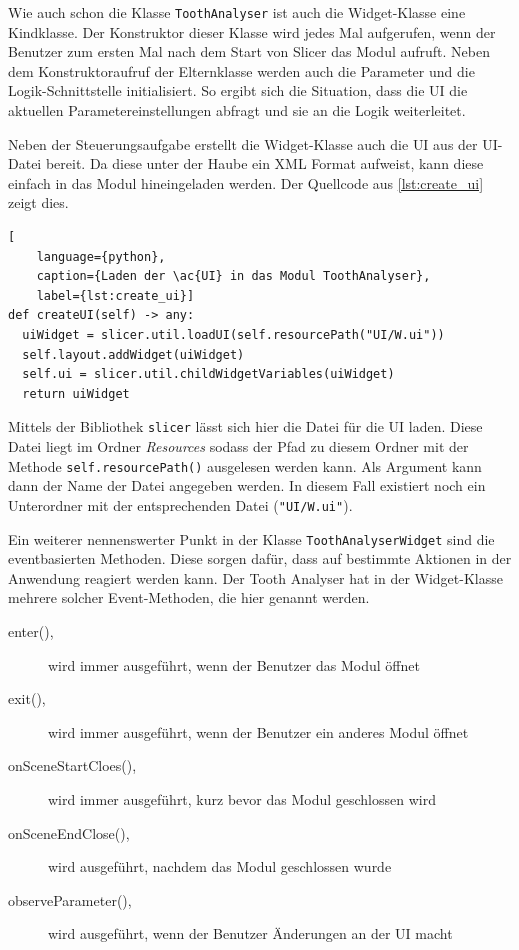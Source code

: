 Wie auch schon die Klasse \texttt{ToothAnalyser} ist auch die Widget-Klasse eine
Kindklasse. Der Konstruktor dieser Klasse wird jedes Mal aufgerufen, wenn der Benutzer
zum ersten Mal nach dem Start von Slicer das Modul aufruft. Neben dem
Konstruktoraufruf der Elternklasse werden auch die Parameter und die Logik-Schnittstelle
initialisiert. So ergibt sich die Situation, dass die \ac{UI} die aktuellen Parametereinstellungen
abfragt und sie an die Logik weiterleitet.

Neben der Steuerungsaufgabe erstellt die Widget-Klasse auch die \ac{UI} aus der
\ac{UI}-Datei bereit. Da diese unter der Haube ein \ac{XML} Format aufweist,
kann diese einfach in das Modul hineingeladen werden. Der Quellcode aus \ref{lst:create_ui}
zeigt dies.

\begin{lstlisting}[
    language={python},
    caption={Laden der \ac{UI} in das Modul ToothAnalyser},
    label={lst:create_ui}]
def createUI(self) -> any:
  uiWidget = slicer.util.loadUI(self.resourcePath("UI/W.ui"))
  self.layout.addWidget(uiWidget)
  self.ui = slicer.util.childWidgetVariables(uiWidget)
  return uiWidget
\end{lstlisting}

Mittels der Bibliothek \texttt{slicer} lässt sich hier die Datei für die \ac{UI}
laden. Diese Datei liegt im Ordner \textit{Resources} sodass der Pfad zu diesem
Ordner mit der Methode \texttt{self.resourcePath()} ausgelesen werden kann. Als
Argument kann dann der Name der Datei angegeben werden. In diesem Fall existiert
noch ein Unterordner mit der entsprechenden Datei (\texttt{"UI/W.ui"}).

Ein weiterer nennenswerter Punkt in der Klasse \texttt{ToothAnalyserWidget} sind
die eventbasierten Methoden. Diese sorgen dafür, dass auf bestimmte Aktionen in der
Anwendung reagiert werden kann. Der Tooth Analyser hat in der Widget-Klasse
mehrere solcher Event-Methoden, die hier genannt werden.

\begin{description}
	\item[enter(),] wird immer ausgeführt, wenn der Benutzer das Modul öffnet

	\item[exit(),] wird immer ausgeführt, wenn der Benutzer ein anderes Modul
		öffnet

	\item[onSceneStartCloes(),] wird immer ausgeführt, kurz bevor das Modul
		geschlossen wird

	\item[onSceneEndClose(),] wird ausgeführt, nachdem das Modul geschlossen wurde

	\item[observeParameter(),] wird ausgeführt, wenn der Benutzer Änderungen an
		der \ac{UI} macht
\end{description}

